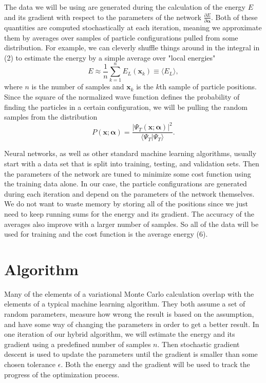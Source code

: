 \documentclass[prb,aps,twocolumn,showpacs,10pt]{revtex4-1}
\begin{document}
The data we will be using are generated during the calculation of the energy $E$ and its gradient with respect to the parameters of the network $\frac{\partial E}{\partial \bm{\alpha}}$. Both of these quantities are computed stochastically at each iteration, meaning we approximate them by averages over samples of particle configurations pulled from some distribution. For example, we can cleverly shuffle things around in the integral in (2) to estimate the energy by a simple average over "local energies"
\begin{equation}
E \approx \frac{1}{n} \sum_{k=1}^n E_L(\bm{x}_k )\equiv \langle E_L\rangle,
\end{equation}
where $n$ is the number of samples and $\bm{x}_k$ is the $k$th sample of particle positions. Since the square of the normalized wave function defines the probability of finding the particles in a certain configuration, we will be pulling the random samples from the distribution
\begin{equation}
P(\bm{x};\bm{\alpha}) = \frac{|\Psi_T(\bm{x};\bm{\alpha})|^2}{\langle \Psi_T | \Psi_T \rangle}.
\end{equation}

Neural networks, as well as other standard machine learning algorithms, usually start with a data set that is split into training, testing, and validation sets. Then the parameters of the network are tuned to minimize some cost function using the training data alone. In our case, the particle configurations are generated during each iteration and depend on the parameters of the network themselves. We do not want to waste memory by storing all of the positions since we just need to keep running sums for the energy and its gradient. The accuracy of the averages also improve with a larger number of samples. So all of the data will be used for training and the cost function is the average energy (6). 

\section{Algorithm}

Many of the elements of a variational Monte Carlo calculation overlap with the elements of a typical machine learning algorithm. They both assume a set of random parameters, measure how wrong the result is based on the assumption, and have some way of changing the parameters in order to get a better result. In one iteration of our hybrid algorithm, we will estimate the energy and its gradient using a predefined number of samples $n$. Then stochastic gradient descent is used to update the parameters until the gradient is smaller than some chosen tolerance $\epsilon$. Both the energy and the gradient will be used to track the progress of the optimization process. 
\end{document}

